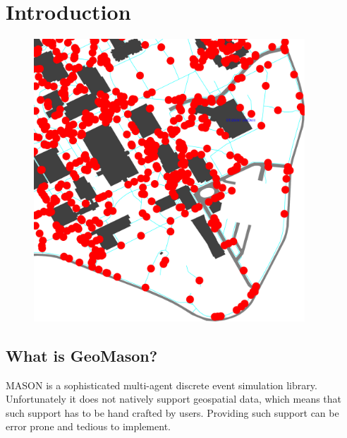 \documentclass[twoside,10pt]{book}
\begin{document}
\normalsize
\cleardoublepage

\tableofcontents
\clearpage


\chapter{Introduction}
\label{ch:intro}

\begin{figure}[h]\vspace{-33em}\hspace{30em}\includegraphics[width=4in]{campus.pdf}\vspace{2em}\end{figure}





\section{What is GeoMason?}
MASON is a sophisticated multi-agent discrete event simulation library.
Unfortunately it does not natively support geospatial data, which
means that such support has to be hand crafted by users.  Providing
such support can be error prone and tedious to implement.
\end{document}
